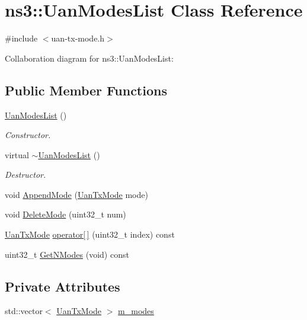 \hypertarget{classns3_1_1UanModesList}{}\section{ns3\+:\+:Uan\+Modes\+List Class Reference}
\label{classns3_1_1UanModesList}


{\ttfamily \#include $<$uan-\/tx-\/mode.\+h$>$}



Collaboration diagram for ns3\+:\+:Uan\+Modes\+List\+:
\subsection*{Public Member Functions}
\begin{DoxyCompactItemize}
\item 
\hyperlink{classns3_1_1UanModesList_a891da70e9724c170d4b1c0297702c011}{Uan\+Modes\+List} ()
\begin{DoxyCompactList}\small\item\em Constructor. \end{DoxyCompactList}\item 
virtual \hyperlink{classns3_1_1UanModesList_af1e6814cc87a6f2bf6597df52109bbab}{$\sim$\+Uan\+Modes\+List} ()
\begin{DoxyCompactList}\small\item\em Destructor. \end{DoxyCompactList}\item 
void \hyperlink{classns3_1_1UanModesList_ae47998ab8ad053aecd5f2849043ec403}{Append\+Mode} (\hyperlink{classns3_1_1UanTxMode}{Uan\+Tx\+Mode} mode)
\item 
void \hyperlink{classns3_1_1UanModesList_a389ea6451ecf76ed5e22382ff3a98f30}{Delete\+Mode} (uint32\+\_\+t num)
\item 
\hyperlink{classns3_1_1UanTxMode}{Uan\+Tx\+Mode} \hyperlink{classns3_1_1UanModesList_aef7067bf0931fce607072164ff4cadc2}{operator\mbox{[}$\,$\mbox{]}} (uint32\+\_\+t index) const 
\item 
uint32\+\_\+t \hyperlink{classns3_1_1UanModesList_a834fe84483421c4e0d80c275fa65fe02}{Get\+N\+Modes} (void) const 
\end{DoxyCompactItemize}
\subsection*{Private Attributes}
\begin{DoxyCompactItemize}
\item 
std\+::vector$<$ \hyperlink{classns3_1_1UanTxMode}{Uan\+Tx\+Mode} $>$ \hyperlink{classns3_1_1UanModesList_afa651aaf3962736a50ddc70e961000cb}{m\+\_\+modes}
\end{DoxyCompactItemize}
